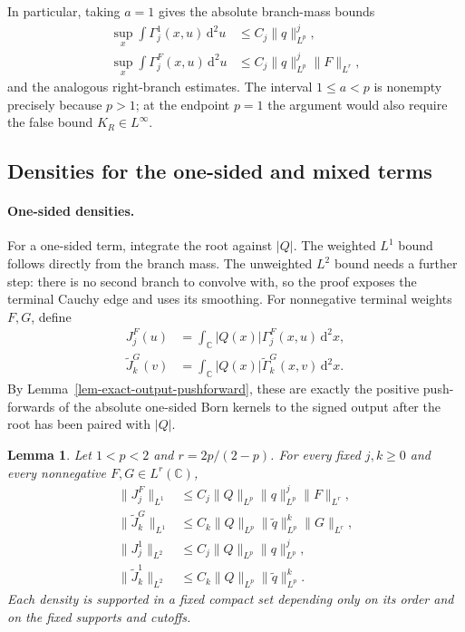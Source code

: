 \documentclass[a4paper,11pt]{article}
\newcommand{\C}{\mathbb{C}}
\newcommand{\dd}{\,\text{d}}
\theoremstyle{plain}
\newtheorem{lem}[thm]{Lemma}
\theoremstyle{definition}
\theoremstyle{remark}
\begin{document}
In particular, taking $a=1$ gives the absolute branch-mass bounds
\begin{align}
 \sup_x\int\Gamma_j^1(x,u)\dd^2u
 &\le C_j\|q\|_{L^p}^j,                              \label{branch-output-mass-unweighted}\\
 \sup_x\int\Gamma_j^F(x,u)\dd^2u
 &\le C_j\|q\|_{L^p}^j\|F\|_{L^r},                 \label{branch-output-mass-weighted}
\end{align}
and the analogous right-branch estimates.  The interval $1\le a<p$ is
nonempty precisely because $p>1$; at the endpoint $p=1$ the argument would also
require the false bound $K_R\in L^\infty$.


\subsection{Densities for the one-sided and mixed terms}

\paragraph{One-sided densities.}
\label{subsubsec-one-sided-output-densities}

For a one-sided term, integrate the root against $|Q|$. The weighted $L^1$ bound follows directly from the branch mass. The unweighted $L^2$ bound needs a further step: there is no second branch to convolve with, so the proof exposes the terminal Cauchy edge and uses its smoothing. For nonnegative terminal weights $F,G$, define
\begin{align}
 J_j^F(u)&=\int_{\C}|Q(x)|\Gamma_j^F(x,u)\dd^2x,
 \label{one-sided-left-density-def}\\
 \widetilde J_k^G(v)&=\int_{\C}|Q(x)|
             \widetilde\Gamma_k^G(x,v)\dd^2x.
 \label{one-sided-right-density-def}
\end{align}
By Lemma~\ref{lem-exact-output-pushforward}, these are exactly the positive
push-forwards of the absolute one-sided Born kernels to the signed output after
the root has been paired with $|Q|$.

\begin{lem}
\label{lem-one-sided-output-densities}
Let $1<p<2$ and $r=2p/(2-p)$.  For every fixed $j,k\ge0$ and every
nonnegative $F,G\in L^r(\C)$,
\begin{align}
 \|J_j^F\|_{L^1}
 &\le C_j\|Q\|_{L^p}\|q\|_{L^p}^j\|F\|_{L^r},
 \label{one-sided-left-weighted-L1}\\
 \|\widetilde J_k^G\|_{L^1}
 &\le C_k\|Q\|_{L^p}\|\widetilde q\|_{L^p}^k
       \|G\|_{L^r},
 \label{one-sided-right-weighted-L1}\\
 \|J_j^1\|_{L^2}
 &\le C_j\|Q\|_{L^p}\|q\|_{L^p}^j,
 \label{one-sided-left-unweighted-L2}\\
 \|\widetilde J_k^1\|_{L^2}
 &\le C_k\|Q\|_{L^p}\|\widetilde q\|_{L^p}^k.
 \label{one-sided-right-unweighted-L2}
\end{align}
Each density is supported in a fixed compact set depending only on its order
and on the fixed supports and cutoffs.
\end{lem}
\end{document}

